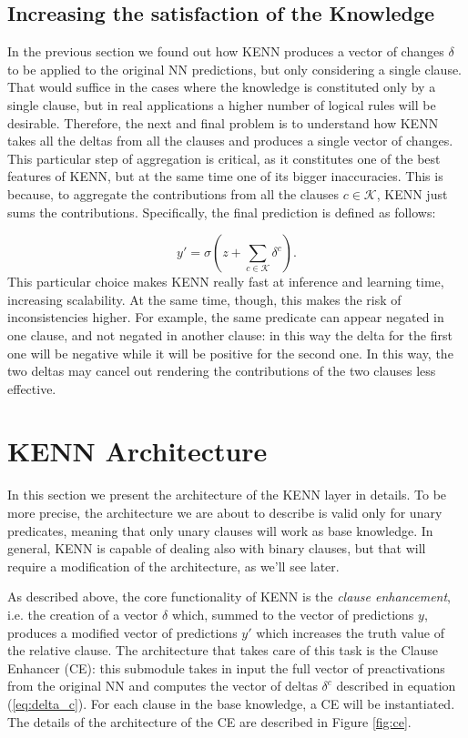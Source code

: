 \subsection{Increasing the satisfaction of the Knowledge}
In the previous section we found out how KENN produces a vector of changes $\delta$ to be applied to the original NN predictions, but only considering a single clause. That would suffice in the cases where the knowledge is constituted only by a single clause, but in real applications a higher number of logical rules will be desirable. Therefore, the next and final problem is to understand how KENN takes all the deltas from all the clauses and produces a single vector of changes. This particular step of aggregation is critical, as it constitutes one of the best features of KENN, but at the same time one of its bigger inaccuracies. This is because, to aggregate the contributions from all the clauses $c \in \mathcal{K}$, KENN just sums the contributions. Specifically, the final prediction is defined as follows:

\begin{equation}
\label{eq:deltas_sum}
y'=\sigma(z + \sum_{c\in\mathcal{K}}\delta^c).
\end{equation}
This particular choice makes KENN really fast at inference and learning time, increasing scalability. At the same time, though, this makes the risk of inconsistencies higher. For example, the same predicate can appear negated in one clause, and not negated in another clause: in this way the delta for the first one will be negative while it will be positive for the second one. In this way, the two deltas may cancel out rendering the contributions of the two clauses less effective.


\section{KENN Architecture}
In this section we present the architecture of the KENN layer in details. To be more precise, the architecture we are about to describe is valid only for unary predicates, meaning that only unary clauses will work as base knowledge. In general, KENN is capable of dealing also with binary clauses, but that will require a modification of the architecture, as we'll see later.

As described above, the core functionality of KENN is the \textit{clause enhancement}, i.e. the creation of a vector $\delta$ which, summed to the vector of predictions $y$, produces a modified vector of predictions $y'$ which increases the truth value of the relative clause. The architecture that takes care of this task is the Clause Enhancer (CE): this submodule takes in input the full vector of preactivations from the original NN and computes the vector of deltas $\delta^c$ described in equation (\ref{eq:delta_c}). For each clause in the base knowledge, a CE will be instantiated. The details of the architecture of the CE are described in Figure \ref{fig:ce}.

